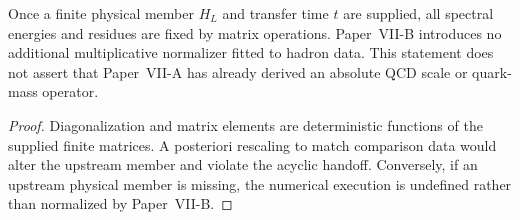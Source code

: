 \documentclass[12pt,a4paper]{article}
\begin{document}
\begin{theorem}
\label{p11:thm:no-additional-shell-normalizer-qcd}

Once a finite physical member \(H_L\) and transfer time \(t\) are supplied, all spectral energies and residues are fixed by matrix operations.  Paper~VII-B introduces no additional multiplicative normalizer fitted to hadron data.  This statement does not assert that Paper~VII-A has already derived an absolute QCD scale or quark-mass operator.
\label{p11:eq:qcd-extra-shell-carrier-test}
\label{p11:eq:qcd-extra-shell-source-zero}
\end{theorem}
\begin{proof}

Diagonalization and matrix elements are deterministic functions of the supplied finite matrices.  A posteriori rescaling to match comparison data would alter the upstream member and violate the acyclic handoff.  Conversely, if an upstream physical member is missing, the numerical execution is undefined rather than normalized by Paper~VII-B.
\end{proof}
\end{document}
